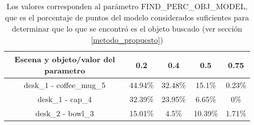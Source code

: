 \begin{table}[h]
	\begin{tabular}{|c|c|c|c|c|}
	\hline 
	Escena y objeto/valor del parametro & 0.2 & 0.4 & 0.5 & 0.75 \\ 
	\hline 
	desk\_1 - coffee\_mug\_5 & 44.94\% & 32.48\% & 15.1\% & 0.23\% \\ 
	\hline 
	desk\_1 - cap\_4 & 32.39\% & 23.95\% & 6.65\% & 0\% \\ 
	\hline 
	desk\_2 - bowl\_3 & 15.01\% & 4.5\% & 10.39\% & 1.71\% \\ 
	\hline 
	\end{tabular}
	\caption{Los valores corresponden al parámetro FIND\_PERC\_OBJ\_MODEL, que es el porcentaje de puntos del modelo considerados suficientes para determinar que lo que se encontró es el objeto buscado (ver sección \ref{metodo_propuesto})}
\end{table}

